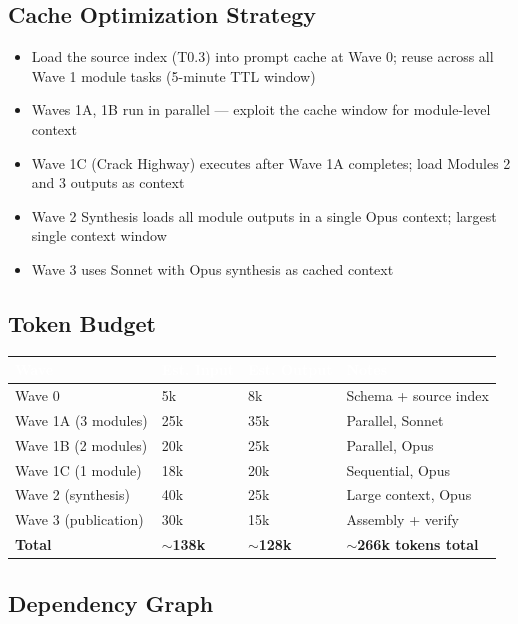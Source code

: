\documentclass[11pt,letterpaper]{article}
\newcommand{\tableheader}[1]{\textbf{\sffamily\textcolor{white}{#1}}}
\begin{document}
\subsection{Cache Optimization Strategy}

\begin{itemize}[leftmargin=1.5em]
  \item Load the source index (T0.3) into prompt cache at Wave 0; reuse across all Wave 1 module tasks (5-minute TTL window)
  \item Waves 1A, 1B run in parallel --- exploit the cache window for module-level context
  \item Wave 1C (Crack Highway) executes after Wave 1A completes; load Modules 2 and 3 outputs as context
  \item Wave 2 Synthesis loads all module outputs in a single Opus context; largest single context window
  \item Wave 3 uses Sonnet with Opus synthesis as cached context
\end{itemize}

\subsection{Token Budget}

\begin{center}
\begin{tabularx}{\textwidth}{L{3cm}C{2cm}C{2cm}C{3cm}}
\toprule
{}
\tableheader{Wave} & \tableheader{Est. Input} & \tableheader{Est. Output} & \tableheader{Notes} \\
\midrule
Wave 0 & 5k & 8k & Schema + source index \\
Wave 1A (3 modules) & 25k & 35k & Parallel, Sonnet \\
Wave 1B (2 modules) & 20k & 25k & Parallel, Opus \\
Wave 1C (1 module) & 18k & 20k & Sequential, Opus \\
Wave 2 (synthesis) & 40k & 25k & Large context, Opus \\
Wave 3 (publication) & 30k & 15k & Assembly + verify \\
\midrule
\textbf{Total} & \textbf{$\sim$138k} & \textbf{$\sim$128k} & \textbf{$\sim$266k tokens total} \\
\bottomrule
\end{tabularx}
\end{center}

\subsection{Dependency Graph}
\end{document}
